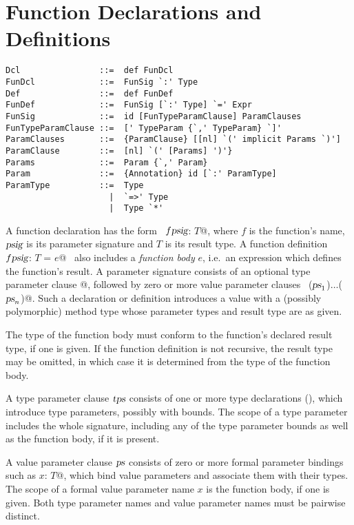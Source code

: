 \section{Function Declarations and Definitions}
\label{sec:funsigs}

\syntax\begin{lstlisting} 
Dcl                ::=  def FunDcl
FunDcl             ::=  FunSig `:' Type
Def                ::=  def FunDef
FunDef             ::=  FunSig [`:' Type] `=' Expr 
FunSig             ::=  id [FunTypeParamClause] ParamClauses
FunTypeParamClause ::=  [' TypeParam {`,' TypeParam} `]' 
ParamClauses       ::=  {ParamClause} [[nl] `(' implicit Params `)']
ParamClause        ::=  [nl] `(' [Params] ')'} 
Params             ::=  Param {`,' Param}
Param              ::=  {Annotation} id [`:' ParamType]
ParamType          ::=  Type 
                     |  `=>' Type 
                     |  Type `*'
\end{lstlisting}

A function declaration has the form ~\lstinline@def $f \mbox{\sl psig}$: $T$@, where
$f$ is the function's name, $\mbox{\sl psig}$ is its parameter
signature and $T$ is its result type. A function definition
~\lstinline@$f \mbox{\sl psig}$: $T$ = $e$@~ also includes a {\em function body} $e$,
i.e.\ an expression which defines the function's result.  A parameter
signature consists of an optional type parameter clause \lstinline@[$\tps\,$]@,
followed by zero or more value parameter clauses
~\lstinline@($\mbox{\sl ps}_1$)$\ldots$($\mbox{\sl ps}_n$)@.  Such a declaration or definition
introduces a value with a (possibly polymorphic) method type whose
parameter types and result type are as given.

The type of the function body must conform to the function's declared
result type, if one is given. If the function definition is not
recursive, the result type may be omitted, in which case it is
determined from the type of the function body.

A type parameter clause $\mbox{\sl tps}$ consists of one or more type
declarations (), which introduce type parameters,
possibly with bounds.  The scope of a type parameter includes
the whole signature, including any of the type parameter bounds as
well as the function body, if it is present.  

A value parameter clause $\mbox{\sl ps}$ consists of zero or more formal
parameter bindings such as \lstinline@$x$: $T$@, which bind value
parameters and associate them with their types.  The scope of a formal
value parameter name $x$ is the function body, if one is
given. Both type parameter names and value parameter names must be
pairwise distinct.

